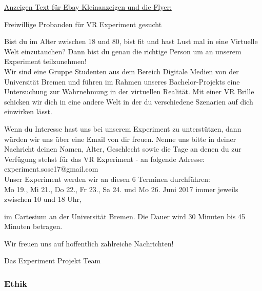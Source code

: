 \documentclass{Bericht}
\begin{document}
\par

\underline{Anzeigen Text für Ebay Kleinanzeigen und die Flyer:}

\par

Freiwillige Probanden für VR Experiment gesucht

\par

Bist du im Alter zwischen 18 und 80, bist fit und hast Lust mal in eine Virtuelle Welt einzutauchen? Dann bist du genau die richtige Person um an unserem Experiment teilzunehmen! \\

Wir sind eine Gruppe Studenten aus dem Bereich Digitale Medien von der Universität Bremen und führen im Rahmen unseres Bachelor-Projekts eine Untersuchung zur Wahrnehmung in der virtuellen Realität. Mit einer VR Brille schicken wir dich in eine andere Welt in der du verschiedene Szenarien auf dich einwirken lässt.

\par

Wenn du Interesse hast uns bei unserem Experiment zu unterstützen, dann würden wir uns über eine Email von dir freuen. Nenne uns bitte in deiner Nachricht deinen Namen, Alter, Geschlecht sowie die Tage an denen du zur Verfügung stehst für das VR Experiment - an folgende Adresse: experiment.sose17@gmail.com \\

Unser Experiment werden wir an diesen 6 Terminen durchführen: \\

Mo 19., Mi 21., Do 22., Fr 23., Sa 24. und Mo 26. Juni 2017 immer jeweils zwischen 10 und 18 Uhr, 

im Cartesium an der Universität Bremen. Die Dauer wird 30 Minuten bis 45 Minuten betragen.

Wir freuen uns auf hoffentlich zahlreiche Nachrichten!




Das Experiment Projekt Team


\par

\subsubsection {Ethik}
\end{document}
